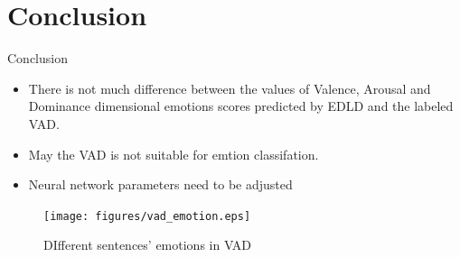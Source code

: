 \documentclass[
 size=14pt,
 paper=smartboard,  %
 mode=present, 		%
 display=slides, 	%
 style=tuliplab,  	%
 pauseslide,
 fleqn,leqno]{powerdot}
\begin{document}
\section{Conclusion}

\begin{slide}[toc=,bm=]{Conclusion}

\bigskip
\begin{itemize}
	\item
	\smallskip
	There is not much difference between 
	the values of Valence, Arousal and Dominance 
	dimensional emotions scores predicted by EDLD
	and the labeled VAD.
	
	\smallskip
	
	\item
	\smallskip
	May the VAD is not suitable 
	for emtion classifation.
	
	\item
	\smallskip
	Neural network parameters need to be adjusted
\end{itemize}

\begin{figure}
	\texttt{[image: figures/vad\_emotion.eps]}
	\caption{DIfferent sentences' emotions in VAD}
\end{figure}

\end{slide}


%

\begin{wideslide}[toc=,bm=]{}
	\centering
	\twocolumn[
	lcolwidth=0.35\linewidth,
	rcolwidth=0.65\linewidth
	]
	{
	}
	{
		
		
		\textcolor{black}{}
		
		
	}
\end{wideslide}

\end{document}
